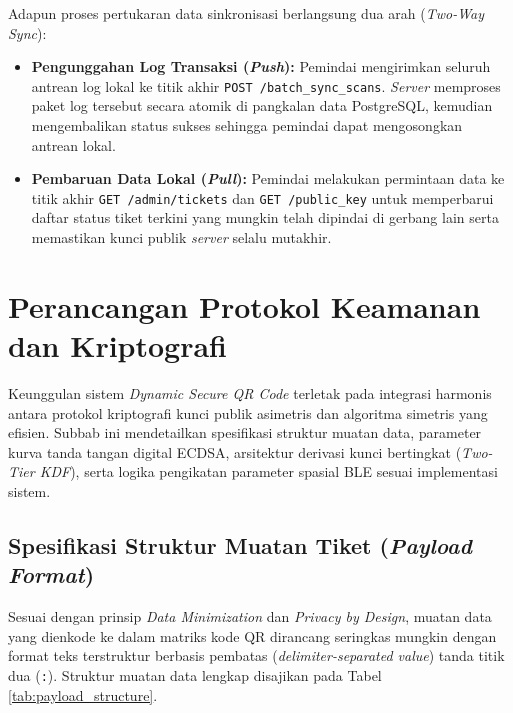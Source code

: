 Adapun proses pertukaran data sinkronisasi berlangsung dua arah (\textit{Two-Way Sync}):
\begin{itemize}
    \item \textbf{Pengunggahan Log Transaksi (\textit{Push}):} Pemindai mengirimkan seluruh antrean log lokal ke titik akhir \texttt{POST /batch\_sync\_scans}. \textit{Server} memproses paket log tersebut secara atomik di pangkalan data PostgreSQL, kemudian mengembalikan status sukses sehingga pemindai dapat mengosongkan antrean lokal.
    \item \textbf{Pembaruan Data Lokal (\textit{Pull}):} Pemindai melakukan permintaan data ke titik akhir \texttt{GET /admin/tickets} dan \texttt{GET /public\_key} untuk memperbarui daftar status tiket terkini yang mungkin telah dipindai di gerbang lain serta memastikan kunci publik \textit{server} selalu mutakhir.
\end{itemize}

\section{Perancangan Protokol Keamanan dan Kriptografi}
\label{sec:perancangan_kriptografi}

Keunggulan sistem \textit{Dynamic Secure QR Code} terletak pada integrasi harmonis antara protokol kriptografi kunci publik asimetris dan algoritma simetris yang efisien. Subbab ini mendetailkan spesifikasi struktur muatan data, parameter kurva tanda tangan digital ECDSA, arsitektur derivasi kunci bertingkat (\textit{Two-Tier KDF}), serta logika pengikatan parameter spasial BLE sesuai implementasi sistem.

\subsection{Spesifikasi Struktur Muatan Tiket (\textit{Payload Format})}
Sesuai dengan prinsip \textit{Data Minimization} dan \textit{Privacy by Design}, muatan data yang dienkode ke dalam matriks kode QR dirancang seringkas mungkin dengan format teks terstruktur berbasis pembatas (\textit{delimiter-separated value}) tanda titik dua (\texttt{:}). Struktur muatan data lengkap disajikan pada Tabel \ref{tab:payload_structure}.

